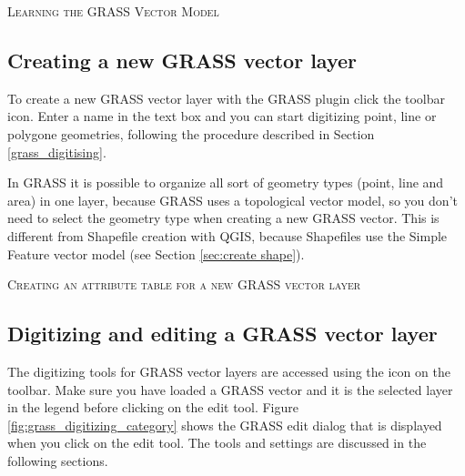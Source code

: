 \begin{Tip}\caption{\textsc{Learning the GRASS Vector Model}}
\end{Tip} 

\subsection{Creating a new GRASS vector layer}\label{sec:creating_new_grass_vectors}

To create a new GRASS vector layer with the GRASS plugin click the 
 toolbar icon. 
Enter a name in the text box and you can start digitizing point, line or 
polygone geometries, following the procedure described in Section 
\ref{grass_digitising}. 

In GRASS it is possible to organize all sort of geometry types (point, line 
and area) in one layer, because GRASS uses a topological vector model, so you 
don't need to select the geometry type when creating a new GRASS vector. This 
is different from Shapefile creation with QGIS, because Shapefiles use the 
Simple Feature vector model (see Section \ref{sec:create shape}).

\begin{Tip}\caption{\textsc{Creating an attribute table for a new GRASS vector layer}}
\end{Tip} 

\subsection{Digitizing and editing a GRASS vector layer}\label{grass_digitising}

The digitizing tools for GRASS vector layers are accessed using the
 icon on the toolbar. Make 
sure you have loaded a GRASS vector and it is the selected layer in the legend 
before clicking on the edit tool. Figure \ref{fig:grass_digitizing_category} 
shows the GRASS edit dialog that is displayed when you click on the edit tool. 
The tools and settings are discussed in the following sections.


